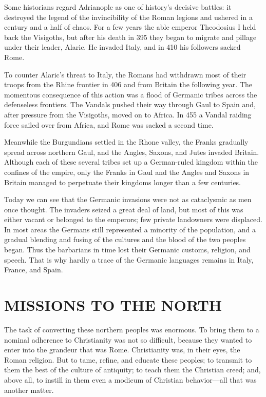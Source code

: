 Some historians regard Adrianople as one of history’s decisive battles: it destroyed the legend of
the invincibility of the Roman legions and ushered in a century and a half of chaos. For a few years
the able emperor Theodosius I held back the Visigoths, but after his death in 395 they began to
migrate and pillage under their leader, Alaric. He invaded Italy, and in 410 his followers sacked
Rome.

To counter Alaric’s threat to Italy, the Romans had withdrawn most of their troops from the Rhine
frontier in 406 and from Britain the following year. The momentous consequence of this action was a
flood of Germanic tribes across the defenseless frontiers. The Vandals pushed their way through Gaul
to Spain and, after pressure from the Visigoths, moved on to Africa. In 455 a Vandal raiding force
sailed over from Africa, and Rome was sacked a second time.

Meanwhile the Burgundians settled in the Rhone valley, the Franks gradually spread across northern
Gaul, and the Angles, Saxons, and Jutes invaded Britain. Although each of these several tribes set
up a German-ruled kingdom within the confines of the empire, only the Franks in Gaul and the Angles
and Saxons in Britain managed to perpetuate their kingdoms longer than a few centuries.

Today we can see that the Germanic invasions were not as cataclysmic as men once thought. The
invaders seized a great deal of land, but most of this was either vacant or belonged to the
emperors; few private landowners were displaced. In most areas the Germans still represented a
minority of the population, and a gradual blending and fusing of the cultures and the blood of the
two peoples began. Thus the barbarians in time lost their Germanic customs, religion, and speech.
That is why hardly a trace of the Germanic languages remains in Italy, France, and Spain.

\section{MISSIONS TO THE NORTH}

The task of converting these northern peoples was enormous. To bring them to a nominal adherence to
Christianity was not so difficult, because they wanted to enter into the grandeur that was Rome.
Christianity was, in their eyes, the Roman religion. But to tame, refine, and educate these peoples;
to transmit to them the best of the culture of antiquity; to teach them the Christian creed; and,
above all, to instill in them even a modicum of Christian behavior—all that was another matter.

